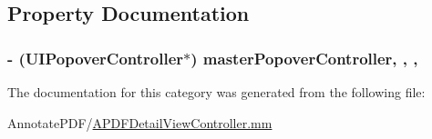 \subsection{Property Documentation}
\hypertarget{category_a_p_d_f_detail_view_controller_07_08_a37566048476f56a66ae190d4e6c6725c}{
\subsubsection[{master\-Popover\-Controller}]{\setlength{\rightskip}{0pt plus 5cm}-\/ (U\-I\-Popover\-Controller$\ast$) master\-Popover\-Controller\hspace{0.3cm}{\ttfamily [read]}, {\ttfamily [write]}, {\ttfamily [nonatomic]}, {\ttfamily [strong]}}}\label{category_a_p_d_f_detail_view_controller_07_08_a37566048476f56a66ae190d4e6c6725c}


The documentation for this category was generated from the following file\-:\begin{DoxyCompactItemize}
\item 
Annotate\-P\-D\-F/\hyperlink{_a_p_d_f_detail_view_controller_8mm}{A\-P\-D\-F\-Detail\-View\-Controller.\-mm}\end{DoxyCompactItemize}
